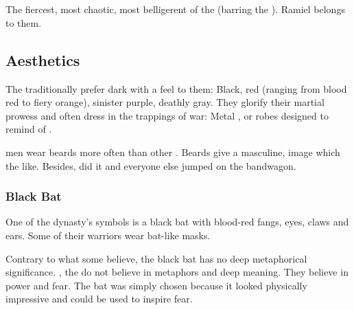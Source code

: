\section[Mystraacht]{\Mystraacht}
The fiercest, most chaotic, most belligerent of the \resphain{} (barring the ). Ramiel belongs to them. 









\subsection{Aesthetics}
The \Mystraacht{} traditionally prefer dark \colours with a  feel to them: 
Black, red (ranging from blood red to fiery orange), sinister purple, deathly gray. 
They glorify their martial prowess and often dress in the trappings of war: 
Metal \armour, or robes designed to remind of \armour. 

\Mystraacht{} men wear beards more often than other \resphain. 
Beards give a masculine,  image which the \Mystraacht{} like. 
Besides, \Zachirah{} did it and everyone else jumped on the bandwagon. 





\subsubsection{Black Bat}
One of the dynasty's symbols is a black bat with blood-red fangs, eyes, claws and ears. Some of their warriors wear bat-like masks. 

Contrary to what some believe, the black bat has no deep metaphorical significance. 
, the \Mystraacht{} do not believe in metaphors and deep meaning. 
They believe in power and fear. 
The bat was simply chosen because it looked physically impressive and could be used to inspire fear.






